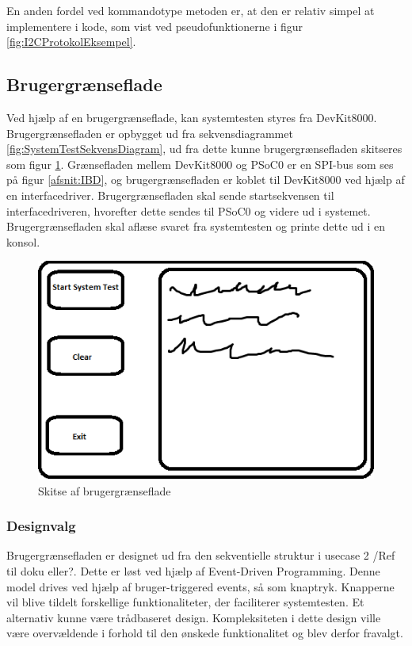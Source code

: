 En anden fordel ved kommandotype metoden er, at den er relativ simpel at implementere i kode, som vist ved pseudofunktionerne i figur \ref{fig:I2CProtokolEksempel}.

\subsection{Brugergrænseflade}
Ved hjælp af en brugergrænseflade, kan systemtesten styres fra DevKit8000.
Brugergrænsefladen er opbygget ud fra sekvensdiagrammet \ref{fig:SystemTestSekvensDiagram},
ud fra dette kunne brugergrænsefladen skitseres som figur \ref{fig:GUISkitse}.
Grænsefladen mellem DevKit8000 og PSoC0 er en SPI-bus som ses på figur \ref{afsnit:IBD}, og brugergrænsefladen er koblet til DevKit8000 ved hjælp af en interfacedriver.
Brugergrænsefladen skal sende startsekvensen til interfacedriveren, hvorefter dette sendes til PSoC0 og videre ud i systemet.
Brugergrænsefladen skal aflæse svaret fra systemtesten og printe dette ud i en konsol.

\begin{figure}[H]
	\centering
	\includegraphics[width=\textwidth] {Systemarkitektur/images/GUISkitse}
	\caption{Skitse af brugergrænseflade}
	\label{fig:GUISkitse}
\end{figure}

\subsubsection{Designvalg}
Brugergrænsefladen er designet ud fra den sekventielle struktur i usecase 2 /Ref til doku eller?. Dette er løst ved hjælp af Event-Driven Programming.
Denne model drives ved hjælp af bruger-triggered events, så som knaptryk. Knapperne vil blive tildelt forskellige funktionaliteter, der faciliterer systemtesten.
Et alternativ kunne være trådbaseret design. Kompleksiteten i dette design ville være overvældende i forhold til den ønskede funktionalitet og blev derfor fravalgt.